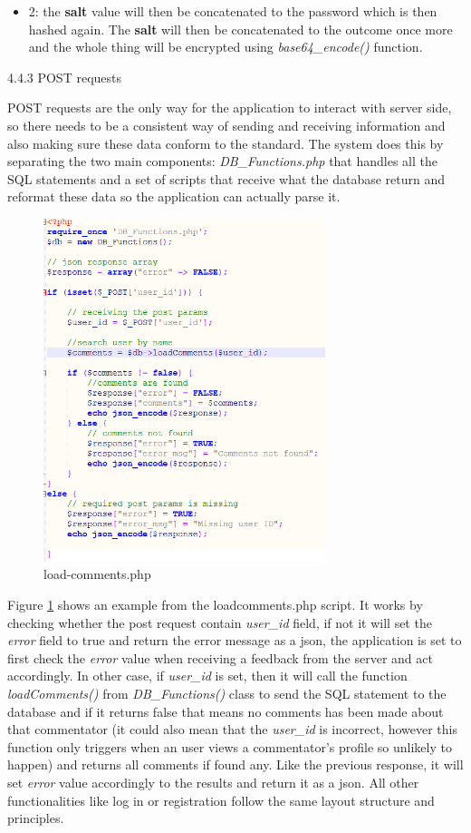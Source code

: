 \documentclass{article}
\begin{document}
\begin{flushleft}
\begin{itemize}
	\item 2: the \textbf{salt} value will then be concatenated to the password which is then hashed again. The \textbf{salt} will then be concatenated to the outcome once more and the whole thing will be encrypted using \textit{base64\_encode()} function.
\end{itemize}
{\large 4.4.3 POST requests}\par
POST requests are the only way for the application to interact with server side, so there needs to be a consistent way of sending and receiving information and also making sure these data conform to the standard. The system does this by separating the two main components: \textit{DB\_Functions.php} that handles all the SQL statements and a set of scripts that receive what the database return and reformat these data so the application can actually parse it.\par
\begin{figure}[H]
	\centering
	\includegraphics[height=10cm]{load-comments}
	\caption{load-comments.php}
	\label{fig:load-comments}
\end{figure}
Figure \ref{fig:load-comments} shows an example from the load\-comments.php script. It works by checking whether the post request contain \textit{user\_id} field, if not it will set the \textit{error} field to true and return the error message as a json, the application is set to first check the \textit{error} value when receiving a feedback from the server and act accordingly. In other case, if \textit{user\_id} is set, then it will call the function \textit{loadComments()} from \textit{DB\_Functions()} class to send the SQL statement to the database and if it returns false that means no comments has been made about that commentator (it could also mean that the \textit{user\_id} is incorrect, however this function only triggers when an user views a commentator's profile so unlikely to happen) and returns all comments if found any. Like the previous response, it will set \textit{error} value accordingly to the results and return it as a json. All other functionalities like log in or registration follow the same layout structure and principles.\par

\end{flushleft}
\end{document}
